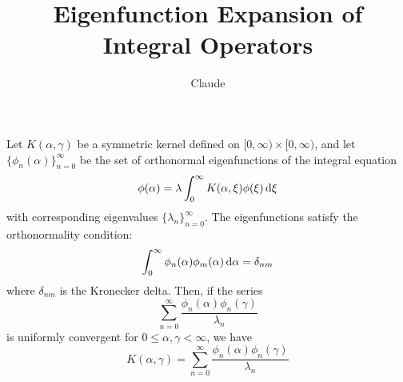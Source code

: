 \title{Eigenfunction Expansion of Integral Operators}

\author{Claude}

\date{}

\maketitle

\begin{theorem}
Let $K(\alpha, \gamma)$ be a symmetric kernel defined on $[0, \infty) \times [0, \infty)$, and let $\{\phi_n(\alpha)\}_{n=0}^\infty$ be the set of orthonormal eigenfunctions of the integral equation
\begin{equation}
  \phi(\alpha) = \lambda \int_0^\infty K(\alpha, \xi) \phi(\xi) \hspace{0.17em}
  \mathrm{d} \xi
\end{equation}
with corresponding eigenvalues $\{\lambda_n\}_{n=0}^\infty$. The eigenfunctions satisfy the orthonormality condition:
\begin{equation}
  \int_0^\infty \phi_n(\alpha) \phi_m(\alpha) \hspace{0.17em} \mathrm{d}\alpha = \delta_{nm}
\end{equation}
where $\delta_{nm}$ is the Kronecker delta. Then, if the series
\begin{equation}
  \sum_{n=0}^{\infty} \frac{\phi_n(\alpha) \phi_n(\gamma)}{\lambda_n}
\end{equation}
is uniformly convergent for $0 \leq \alpha, \gamma < \infty$, we have
\begin{equation}
  K(\alpha, \gamma) = \sum_{n=0}^{\infty} \frac{\phi_n(\alpha) \phi_n(\gamma)}{\lambda_n}
\end{equation}
\end{theorem}

